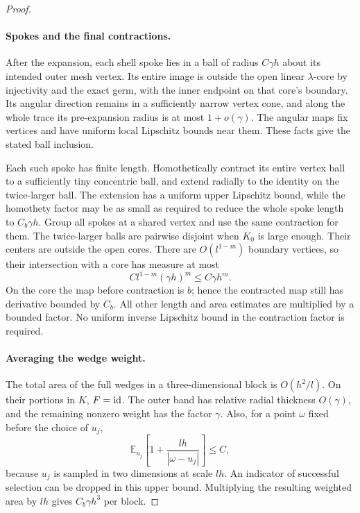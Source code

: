 \begin{proof}
\paragraph{Spokes and the final contractions.}
After the expansion, each shell spoke lies in a ball of radius
$C\gamma h$ about its intended outer mesh vertex.  Its entire image is outside the open linear $\lambda$-core by
injectivity and the exact germ, with the inner endpoint on that
core's boundary.  Its angular direction remains in a sufficiently
narrow vertex cone, and along the whole trace its pre-expansion
radius is at most $1+o(\gamma)$.  The angular maps fix vertices and have uniform local
Lipschitz bounds near them.  These facts give the stated ball
inclusion.

Each such spoke has finite length.  Homothetically contract its
entire vertex ball to a sufficiently tiny concentric ball, and extend
radially to the identity on the twice-larger ball.  The extension has
a uniform upper Lipschitz bound, while the homothety factor may be as
small as required to reduce the whole spoke length to
$C_b\gamma h$.  Group all spokes at a shared vertex and use the same
contraction for them.  The twice-larger balls are pairwise disjoint
when $K_0$ is large enough.  Their centers are outside the open cores.
There are $O(l^{1-m})$ boundary vertices, so their intersection with
a core has measure at most
\[
 C l^{1-m}(\gamma h)^m\le C\gamma h^m.
\]
On the core the map before contraction is $b$; hence the contracted
map still has derivative bounded by $C_b$.  All other length and
area estimates are multiplied by a bounded factor.  No uniform
inverse Lipschitz bound in the contraction factor is required.

\paragraph{Averaging the wedge weight.}
The total area of the full wedges in a three-dimensional block is
$O(h^2/l)$.  On their portions in $K$, $F=\operatorname{id}$.  The outer band has
relative radial thickness $O(\gamma)$, and the remaining nonzero
weight has the factor $\gamma$.  Also, for a point $\omega$ fixed
before the choice of $u_j$,
\[
 \mathbb E_{u_j}\left[1+\frac{lh}{|\omega-u_j|}\right]\le C,
\]
because $u_j$ is sampled in two dimensions at scale $lh$.  An
indicator of successful selection can be dropped in this upper
bound.  Multiplying the resulting weighted area by $lh$ gives
$C_b\gamma h^3$ per block.


\end{proof}
